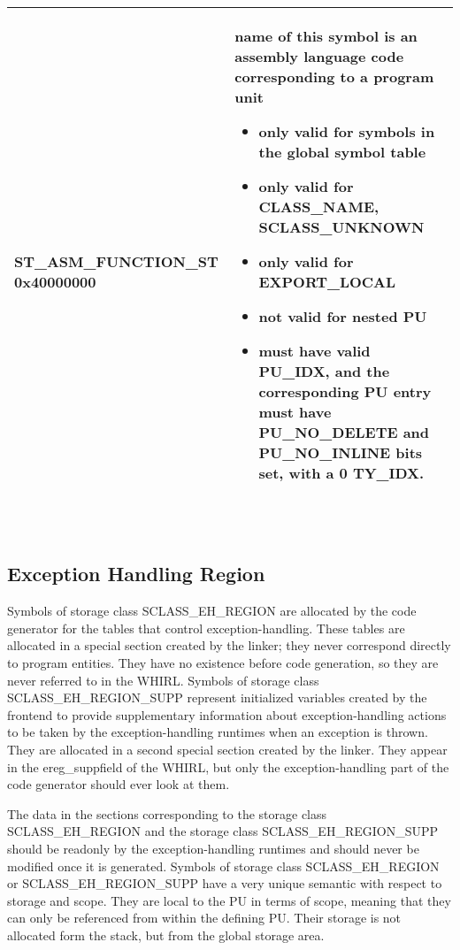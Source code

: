 \begin{longtable}{|p{2in}|p{4in}|}
\index{ST\_ASM\_FUNCTION\_ST}%
ST\_ASM\_FUNCTION\_ST 0x40000000 & 
\begin{minipage}{3.5in}
\flushleft
name of this symbol is an assembly language code corresponding to a
program unit
\begin{itemize}
\item only valid for symbols in the global symbol table
\item only valid for CLASS\_NAME,
\index{SCLASS\_UNKNOWN}%
SCLASS\_UNKNOWN
\item only valid for
\index{EXPORT\_LOCAL}%
EXPORT\_LOCAL
\item not valid for nested
\index{PU}%
PU
\item must have valid PU\_IDX, and the corresponding
\index{PU}%
PU entry must have
\index{PU\_NO\_DELETE}%
PU\_NO\_DELETE and
\index{PU\_NO\_INLINE}%
PU\_NO\_INLINE bits set, with a 0 TY\_IDX.
\end{itemize}
~
\end{minipage}\\\hline
\end{longtable}

\subsection{Exception Handling Region}



Symbols of storage class
%
SCLASS\_EH\_REGION are allocated by the code
generator for the tables that control exception-handling. These tables
are allocated in a special section created by the linker; they never
correspond directly to program entities. They have no existence before
code generation, so they are never referred to in the WHIRL. Symbols
of storage class
%
SCLASS\_EH\_REGION\_SUPP represent initialized
variables created by the frontend to provide supplementary information
about exception-handling actions to be taken by the exception-handling
runtimes when an exception is thrown. They are allocated in a second
special section created by the linker. They appear in the
ereg\_suppfield of the WHIRL, but only the exception-handling part of
the code generator should ever look at them.

The data in the sections corresponding to the storage class
%
SCLASS\_EH\_REGION and the storage class
%
SCLASS\_EH\_REGION\_SUPP
should be readonly by the exception-handling runtimes and should never
be modified once it is generated. Symbols of storage class
%
SCLASS\_EH\_REGION or
%
SCLASS\_EH\_REGION\_SUPP have a very unique
semantic with respect to storage and scope. They are local to the
%
PU in
terms of scope, meaning that they can only be referenced from within
the defining PU. Their storage is not allocated form the stack, but
from the global storage area.

